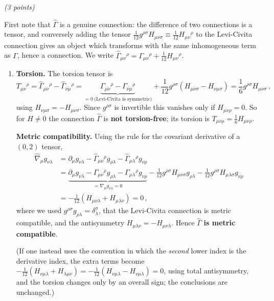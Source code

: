 \documentclass[12pt]{article}
\newcommand{\be}{\begin{equation}}
\newcommand{\ee}{\end{equation}}
\newcounter{quesno}
\newcommand{\ques}[1]{\vspace{2em}\stepcounter{quesno}
\noindent{\bf Question \thequesno.} \emph{(#1 points)}\par\medskip}
\newcommand{\pa}{\partial}
\begin{document}
\ques{3}

First note that $\hat\Gamma$ is a genuine connection: the difference of two connections is a tensor, and
conversely adding the tensor $\frac{1}{12}g^{\rho\sigma}H_{\mu\nu\sigma}\equiv \frac1{12}H_{\mu\nu}{}^\rho$ to the
Levi-Civita connection gives an object which transforms with the same inhomogeneous term as $\Gamma$, hence a connection.
We write $\hat\Gamma_{\mu\nu}{}^\rho = \Gamma_{\mu\nu}{}^\rho + \frac1{12}H_{\mu\nu}{}^\rho$.

\begin{enumerate}[label=\alph*)]
\item \textbf{Torsion.} The torsion tensor is
\be
T_{\mu\nu}{}^\rho = \hat\Gamma_{\mu\nu}{}^\rho - \hat\Gamma_{\nu\mu}{}^\rho
= \underbrace{\Gamma_{\mu\nu}{}^\rho - \Gamma_{\nu\mu}{}^\rho}_{=0\ \text{(Levi-Civita is symmetric)}}
+ \frac{1}{12} g^{\rho\sigma}\left(H_{\mu\nu\sigma} - H_{\nu\mu\sigma}\right)
= \frac{1}{6} g^{\rho\sigma} H_{\mu\nu\sigma}\,,
\ee
using $H_{\nu\mu\sigma} = -H_{\mu\nu\sigma}$. Since $g^{\rho\sigma}$ is invertible this vanishes only if $H_{\mu\nu\rho}=0$.
So for $H\neq 0$ the connection $\hat\Gamma$ is \textbf{not torsion-free}; its torsion is
$T_{\mu\nu\rho} = \frac16 H_{\mu\nu\rho}$.

\textbf{Metric compatibility.} Using the rule for the covariant derivative of a $(0,2)$ tensor,
\begin{align}
\hat\nabla_\mu g_{\nu\lambda}
&= \pa_\mu g_{\nu\lambda} - \hat\Gamma_{\mu\nu}{}^\rho g_{\rho\lambda} - \hat\Gamma_{\mu\lambda}{}^\rho g_{\nu\rho} \nonumber\\
&= \underbrace{\pa_\mu g_{\nu\lambda} - \Gamma_{\mu\nu}{}^\rho g_{\rho\lambda} - \Gamma_{\mu\lambda}{}^\rho g_{\nu\rho}}_{=\nabla_\mu g_{\nu\lambda}=0}
- \frac{1}{12} g^{\rho\sigma} H_{\mu\nu\sigma} g_{\rho\lambda}
- \frac{1}{12} g^{\rho\sigma} H_{\mu\lambda\sigma} g_{\nu\rho} \nonumber\\
&= -\frac{1}{12}\left( H_{\mu\nu\lambda} + H_{\mu\lambda\nu}\right) = 0\,,
\end{align}
where we used $g^{\rho\sigma}g_{\rho\lambda} = \delta^\sigma_\lambda$, that the Levi-Civita connection is metric compatible,
and the antisymmetry $H_{\mu\lambda\nu} = - H_{\mu\nu\lambda}$. Hence $\hat\Gamma$ \textbf{is metric compatible}.

(If one instead uses the convention in which the \emph{second} lower index is the derivative index, the extra
terms become $-\frac1{12}(H_{\nu\mu\lambda}+H_{\lambda\mu\nu}) = -\frac1{12}(H_{\nu\mu\lambda}-H_{\nu\mu\lambda})=0$, using
total antisymmetry, and the torsion changes only by an overall sign; the conclusions are unchanged.)


\end{enumerate}
\end{document}
